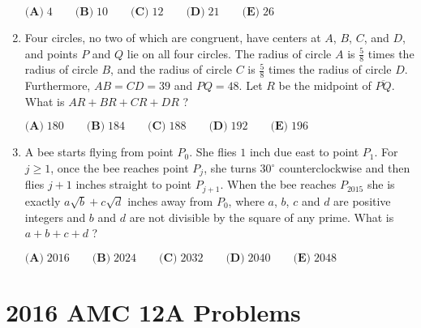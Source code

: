 \documentclass{article}
\begin{document}
\begin{enumerate}[label=\arabic*., itemsep=0.5em]
\(\textbf{(A)}\; 4 \qquad\textbf{(B)}\; 10 \qquad\textbf{(C)}\; 12 \qquad\textbf{(D)}\; 21 \qquad\textbf{(E)}\; 26\)\par \vspace{0.5em}\item Four circles, no two of which are congruent, have centers at \(A\), \(B\), \(C\), and \(D\), and points \(P\) and \(Q\) lie on all four circles. The radius of circle \(A\) is \(\tfrac{5}{8}\) times the radius of circle \(B\), and the radius of circle \(C\) is \(\tfrac{5}{8}\) times the radius of circle \(D\). Furthermore, \(AB = CD = 39\) and \(PQ = 48\). Let \(R\) be the midpoint of \(\overline{PQ}\). What is \(AR+BR+CR+DR\) ?

\(\textbf{(A)}\; 180 \qquad\textbf{(B)}\; 184 \qquad\textbf{(C)}\; 188 \qquad\textbf{(D)}\; 192\qquad\textbf{(E)}\; 196\)\par \vspace{0.5em}\item A bee starts flying from point \(P_0\). She flies \(1\) inch due east to point \(P_1\). For \(j \ge 1\), once the bee reaches point \(P_j\), she turns \(30^{\circ}\) counterclockwise and then flies \(j+1\) inches straight to point \(P_{j+1}\). When the bee reaches \(P_{2015}\) she is exactly \(a \sqrt{b} + c \sqrt{d}\) inches away from \(P_0\), where \(a\), \(b\), \(c\) and \(d\) are positive integers and \(b\) and \(d\) are not divisible by the square of any prime. What is \(a+b+c+d\) ?

\(\textbf{(A)}\; 2016 \qquad\textbf{(B)}\; 2024 \qquad\textbf{(C)}\; 2032 \qquad\textbf{(D)}\; 2040 \qquad\textbf{(E)}\; 2048\)\par \vspace{0.5em}\end{enumerate}\newpage\section*{2016 AMC 12A Problems}
\end{document}
